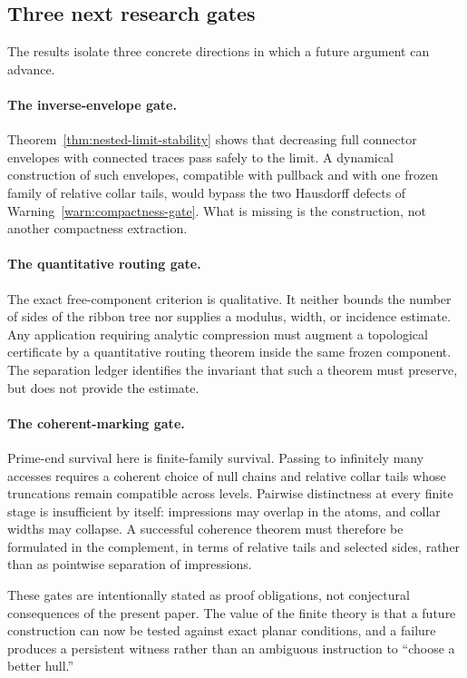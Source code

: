 \subsection{Three next research gates}

The results isolate three concrete directions in which a future argument can
advance.

\paragraph{The inverse-envelope gate.}
Theorem~\ref{thm:nested-limit-stability} shows that decreasing full connector
envelopes with connected traces pass safely to the limit.  A dynamical
construction of such envelopes, compatible with pullback and with one frozen
family of relative collar tails, would bypass the two Hausdorff defects of
Warning~\ref{warn:compactness-gate}.  What is missing is the construction,
not another compactness extraction.

\paragraph{The quantitative routing gate.}
The exact free-component criterion is qualitative.  It neither bounds the
number of sides of the ribbon tree nor supplies a modulus, width, or
incidence estimate.  Any application requiring analytic compression must
augment a topological certificate by a quantitative routing theorem inside
the same frozen component.  The separation ledger identifies the invariant
that such a theorem must preserve, but does not provide the estimate.

\paragraph{The coherent-marking gate.}
Prime-end survival here is finite-family survival.  Passing to infinitely
many accesses requires a coherent choice of null chains and relative
collar tails whose truncations remain compatible across levels.  Pairwise
distinctness at every finite stage is insufficient by itself: impressions
may overlap in the atoms, and collar widths may collapse.  A successful
coherence theorem must therefore be formulated in the complement, in terms
of relative tails and selected sides, rather than as pointwise separation of
impressions.

These gates are intentionally stated as proof obligations, not conjectural
consequences of the present paper.  The value of the finite theory is that a
future construction can now be tested against exact planar conditions, and a
failure produces a persistent witness rather than an ambiguous instruction
to ``choose a better hull.''
